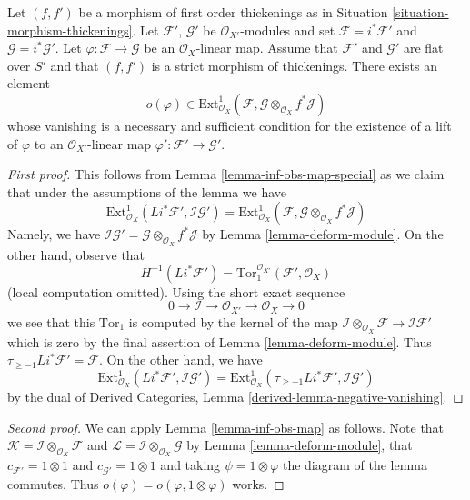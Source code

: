 \begin{lemma}
\label{lemma-inf-obs-map-rel}
Let $(f, f')$ be a morphism of first
order thickenings as in Situation \ref{situation-morphism-thickenings}.
Let $\mathcal{F}'$, $\mathcal{G}'$ be $\mathcal{O}_{X'}$-modules and set
$\mathcal{F} = i^*\mathcal{F}'$ and $\mathcal{G} = i^*\mathcal{G}'$.
Let $\varphi : \mathcal{F} \to \mathcal{G}$ be an $\mathcal{O}_X$-linear map.
Assume that $\mathcal{F}'$ and $\mathcal{G}'$ are flat over $S'$ and
that $(f, f')$ is a strict morphism of thickenings. There exists an element
$$
o(\varphi) \in  \text{Ext}^1_{\mathcal{O}_X}(\mathcal{F},
\mathcal{G} \otimes_{\mathcal{O}_X} f^*\mathcal{J})
$$
whose vanishing is a necessary and sufficient condition for the
existence of a lift of $\varphi$ to an $\mathcal{O}_{X'}$-linear map
$\varphi' : \mathcal{F}' \to \mathcal{G}'$.
\end{lemma}

\begin{proof}[First proof]
This follows from Lemma \ref{lemma-inf-obs-map-special}
as we claim that under the assumptions of the lemma we have
$$
\text{Ext}^1_{\mathcal{O}_X}(Li^*\mathcal{F}',
\mathcal{I}\mathcal{G}') =
\text{Ext}^1_{\mathcal{O}_X}(\mathcal{F},
\mathcal{G} \otimes_{\mathcal{O}_X} f^*\mathcal{J})
$$
Namely, we have
$\mathcal{I}\mathcal{G}' =
\mathcal{G} \otimes_{\mathcal{O}_X} f^*\mathcal{J}$
by Lemma \ref{lemma-deform-module}.
On the other hand, observe that
$$
H^{-1}(Li^*\mathcal{F}') =
\text{Tor}_1^{\mathcal{O}_{X'}}(\mathcal{F}', \mathcal{O}_X)
$$
(local computation omitted). Using the short exact sequence
$$
0 \to \mathcal{I} \to \mathcal{O}_{X'} \to \mathcal{O}_X \to 0
$$
we see that this $\text{Tor}_1$ is computed by the kernel of the map
$\mathcal{I} \otimes_{\mathcal{O}_X} \mathcal{F} \to \mathcal{I}\mathcal{F}'$
which is zero by the final assertion of Lemma \ref{lemma-deform-module}.
Thus $\tau_{\geq -1}Li^*\mathcal{F}' = \mathcal{F}$.
On the other hand, we have
$$
\text{Ext}^1_{\mathcal{O}_X}(Li^*\mathcal{F}',
\mathcal{I}\mathcal{G}') =
\text{Ext}^1_{\mathcal{O}_X}(\tau_{\geq -1}Li^*\mathcal{F}',
\mathcal{I}\mathcal{G}')
$$
by the dual of
Derived Categories, Lemma \ref{derived-lemma-negative-vanishing}.
\end{proof}

\begin{proof}[Second proof]
We can apply Lemma \ref{lemma-inf-obs-map} as follows. Note that
$\mathcal{K} = \mathcal{I} \otimes_{\mathcal{O}_X} \mathcal{F}$ and
$\mathcal{L} = \mathcal{I} \otimes_{\mathcal{O}_X} \mathcal{G}$
by Lemma \ref{lemma-deform-module}, that
$c_{\mathcal{F}'} = 1 \otimes 1$ and $c_{\mathcal{G}'} = 1 \otimes 1$
and taking $\psi = 1 \otimes \varphi$ the diagram of the lemma
commutes. Thus $o(\varphi) = o(\varphi, 1 \otimes \varphi)$
works.
\end{proof}

